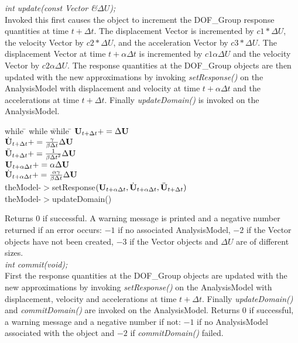 {\em int update(const Vector \&$\Delta U$);} \\
Invoked this first causes the object to increment the DOF\_Group
response quantities at time $t + \Delta t$. The displacement Vector is  
incremented by $ c1 * \Delta U$, the velocity Vector by $
c2 * \Delta U$, and the acceleration Vector by $c3 * \Delta U$. 
The displacement Vector at time $t + \alpha \Delta t$ is incremented
by $c1 \alpha \Delta U$ and the velocity Vector by $c2 \alpha \Delta U$.
The response quantities at the DOF\_Group objects are then updated
with the new approximations by invoking {\em setResponse()} on the
AnalysisModel with displacement and velocity at time $t + \alpha
\Delta t$ and the accelerations at time $t + \Delta t$. 
Finally {\em updateDomain()} is invoked on the AnalysisModel. 
\begin{tabbing}
while \= \+ while \= while \= \kill
\>\> $ {\bf U}_{t + \Delta t} += \Delta {\bf U}$ \\
\>\> $ \dot {{\bf U}}_{t + \Delta t} += \frac{\gamma}{\beta \Delta t} \Delta {\bf U} $\\
\>\> $ \ddot {{\bf U}}_{t + \Delta t} += \frac{1}{\beta {\Delta t}^2} \Delta {\bf U} $\\
\>\> $ {\bf U}_{t + \alpha \Delta t} += \alpha \Delta {\bf U} $ \\
\>\> $ \dot{\bf U}_{t + \alpha \Delta t} += \frac{\alpha \gamma}{\beta \Delta t}
\Delta {\bf U} $\\ 
\>\> theModel-$>$setResponse$({\bf U}_{t + \alpha \Delta t}, \dot{\bf U}_{t+\alpha
\Delta t}, \ddot{\bf U}_{t+\Delta t})$ \\
\>\> theModel-$>$updateDomain()
\end{tabbing}
Returns
$0$ if successful. A warning message is printed and a negative number
returned if an error occurs: $-1$ if no associated AnalysisModel, $-2$
if the Vector objects have not been created, $-3$ if the Vector
objects and $\Delta U$ are of different sizes. \\


{\em int commit(void);}\\
First the response quantities at the DOF\_Group objects are updated
with the new approximations by invoking {\em setResponse()} on the
AnalysisModel with displacement, velocity and accelerations at time $t +
\Delta t$. Finally {\em updateDomain()} and {\em commitDomain()} are
invoked on the AnalysisModel. 
Returns $0$ if successful, a warning
message and a negative number if not: $-1$ if no AnalysisModel
associated with the object and $-2$ if {\em commitDomain()} failed. \\


